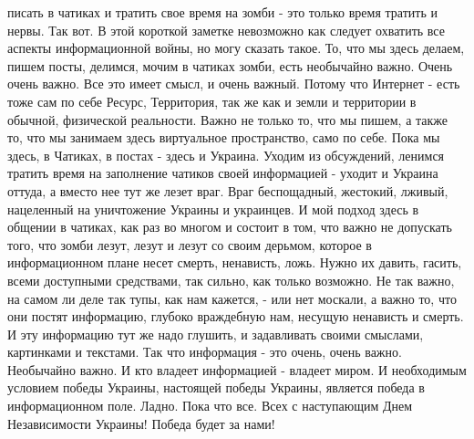 писать в чатиках и тратить свое время на зомби - это только время тратить и
нервы. Так вот. В этой короткой заметке невозможно как следует охватить все
аспекты информационной войны, но могу сказать такое. То, что мы здесь делаем,
пишем посты, делимся, мочим в чатиках зомби, есть необычайно важно. Очень очень
важно. Все это имеет смысл, и очень важный. Потому что Интернет - есть тоже сам
по себе Ресурс, Территория, так же как и земли и территории в обычной,
физической реальности. Важно не только то, что мы пишем, а также то, что мы
занимаем здесь виртуальное пространство, само по себе. Пока мы здесь, в
Чатиках, в постах - здесь и Украина. Уходим из обсуждений, ленимся тратить
время на заполнение чатиков своей информацией - уходит и Украина оттуда, а
вместо нее тут же лезет враг. Враг беспощадный, жестокий, лживый, нацеленный на
уничтожение Украины и украинцев. И мой подход здесь в общении в чатиках, как
раз во многом и состоит в том, что важно не допускать того, что зомби лезут,
лезут и лезут со своим дерьмом, которое в информационном плане несет смерть,
ненависть, ложь. Нужно их давить, гасить, всеми доступными средствами, так
сильно, как только возможно. Не так важно, на самом ли деле так тупы, как нам
кажется, - или нет москали, а важно то, что они постят информацию, глубоко
враждебную нам, несущую ненависть и смерть. И эту информацию тут же надо
глушить, и задавливать своими смыслами, картинками и текстами. Так что
информация - это очень, очень важно. Необычайно важно. И кто владеет
информацией - владеет миром. И необходимым условием победы Украины, настоящей
победы Украины, является победа в информационном поле.  Ладно. Пока что все.
Всех с наступающим Днем Независимости Украины! Победа будет за нами!





